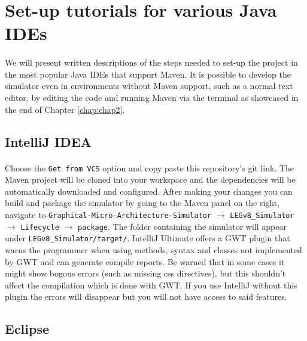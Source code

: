 \section{Set-up tutorials for various Java IDEs}
\paragraph{}
We will present written descriptions of the steps needed to set-up the project in the most popular Java IDEs that support Maven. It is possible to develop the simulator even in environments without Maven support, such as a normal text editor, by editing the code and running Maven via the terminal as showcased in the end of Chapter \ref{chap:chap2}.
\subsection{IntelliJ IDEA}
\paragraph{}
Choose the \verb|Get from VCS| option and copy paste this repository's git link. The Maven project will be cloned into your workspace and the dependencies will be automatically downloaded and configured. After making your changes you can build and package the simulator by going to the Maven panel on the right, navigate to \verb|Graphical-Micro-Architecture-Simulator| $\longrightarrow$ \verb|LEGv8_Simulator| $\longrightarrow$ \verb|Lifecycle| $\longrightarrow$ \verb|package|. The folder containing the simulator will appear under \verb|LEGv8_Simulator/target/|.
IntelliJ Ultimate offers a GWT plugin that warns the programmer when using methods, syntax and classes not implemented by GWT and can generate compile reports. Be warned that in some cases it might show bogous errors (such as missing css directives), but this shouldn't affect the compilation which is done with GWT. If you use IntelliJ without this plugin the errors will disappear but you will not have access to said features.
\subsection{Eclipse}
